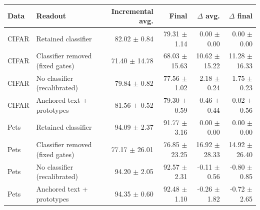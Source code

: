 \begin{tabular}{llrrrr}
\toprule
Data & Readout & Incremental avg. & Final & $\Delta$ avg. & $\Delta$ final \\
\midrule
CIFAR & Retained classifier & 82.02 $\pm$ 0.84 & 79.31 $\pm$ 1.14 & 0.00 $\pm$ 0.00 & 0.00 $\pm$ 0.00 \\
CIFAR & Classifier removed (fixed gates) & 71.40 $\pm$ 14.78 & 68.03 $\pm$ 15.63 & 10.62 $\pm$ 15.22 & 11.28 $\pm$ 16.33 \\
CIFAR & No classifier (recalibrated) & 79.84 $\pm$ 0.82 & 77.56 $\pm$ 1.02 & 2.18 $\pm$ 0.24 & 1.75 $\pm$ 0.23 \\
CIFAR & Anchored text + prototypes & 81.56 $\pm$ 0.52 & 79.30 $\pm$ 0.59 & 0.46 $\pm$ 0.44 & 0.02 $\pm$ 0.56 \\
Pets & Retained classifier & 94.09 $\pm$ 2.37 & 91.77 $\pm$ 3.16 & 0.00 $\pm$ 0.00 & 0.00 $\pm$ 0.00 \\
Pets & Classifier removed (fixed gates) & 77.17 $\pm$ 26.01 & 76.85 $\pm$ 23.25 & 16.92 $\pm$ 28.33 & 14.92 $\pm$ 26.40 \\
Pets & No classifier (recalibrated) & 94.20 $\pm$ 2.05 & 92.57 $\pm$ 2.31 & -0.11 $\pm$ 0.56 & -0.80 $\pm$ 0.85 \\
Pets & Anchored text + prototypes & 94.35 $\pm$ 0.60 & 92.48 $\pm$ 1.10 & -0.26 $\pm$ 1.82 & -0.72 $\pm$ 2.65 \\
\bottomrule
\end{tabular}